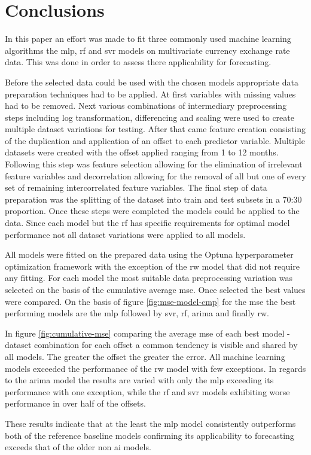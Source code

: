 \section{Conclusions}\label{Conclusions}

In this paper an effort was made to fit three commonly used machine learning algorithms the \gls{mlp}, \gls{rf} and \gls{svr} models on multivariate currency exchange rate data. This was done in order to assess there applicability for forecasting.

Before the selected data could be used with the chosen models appropriate data preparation techniques had to be applied. At first variables with missing values had to be removed. Next various combinations of intermediary preprocessing steps including log transformation, differencing and scaling were used to create multiple dataset variations for testing. After that came feature creation consisting of the duplication and application of an offset to each predictor variable. Multiple datasets were created with the offset applied ranging from 1 to 12 months. Following this step was feature selection allowing for the elimination of irrelevant feature variables and decorrelation allowing for the removal of all but one of every set of remaining intercorrelated feature variables. The final step of data preparation was the splitting of the dataset into train and test subsets in a 70:30 proportion. Once these steps were completed the models could be applied to the data. Since each model but the \gls{rf} has specific requirements for optimal model performance not all dataset variations were applied to all models.

All models were fitted on the prepared data using the Optuna hyperparameter optimization framework with the exception of the \gls{rw} model that did not require any fitting. For each model the most suitable data preprocessing variation was selected on the basis of the cumulative average \gls{mse}. Once selected the best values were compared. On the basis of figure \ref{fig:mse-model-cmp} for the \gls{mse} the best performing models are the \gls{mlp} followed by \gls{svr}, \gls{rf}, \gls{arima} and finally \gls{rw}.

In figure \ref{fig:cumulative-mse} comparing the average \gls{mse} of each best model - dataset combination for each offset a common tendency is visible and shared by all models. The greater the offset the greater the error. All machine learning models exceeded the performance of the \gls{rw} model with few exceptions. In regards to the \gls{arima} model the results are varied with only the \gls{mlp} exceeding its performance with one exception, while the \gls{rf} and \gls{svr} models exhibiting worse performance in over half of the offsets.

These results indicate that at the least the \gls{mlp} model consistently outperforms both of the reference baseline models confirming its applicability to forecasting exceeds that of the older non \gls{ai} models.

